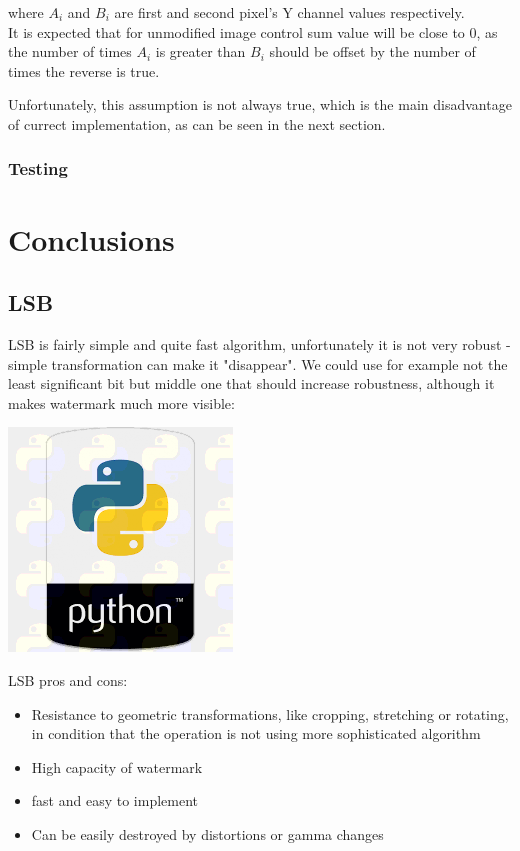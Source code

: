 \documentclass[a4paper, 12pt]{article}
\begin{document}
    where $A_i$ and $B_i$ are first and second pixel's Y channel values respectively. \\
    
    It is expected that for unmodified image control sum value will be close to 0, as the number of times $A_i$ is greater than $B_i$ should be offset by the number of times the reverse is true.
    
    Unfortunately, this assumption is not always true, which is the main disadvantage of currect implementation, as can be seen in the next section.
	
	\subsubsection{Testing}



\section{Conclusions}

	\subsection{LSB}

	LSB is fairly simple and quite fast algorithm, unfortunately it is not very robust - simple transformation can make it "disappear". We could use for example not the least significant bit but middle one that should increase robustness, although it makes watermark much more visible:



	 \begin{center}
		\includegraphics[scale=0.5]{python_lsb/watermarked_python_4bit.png}
	\end{center}

	LSB pros and cons:
	\begin{itemize}

		\item Resistance to geometric transformations, like cropping, stretching or rotating, in condition that the operation is not using more sophisticated algorithm
		\item High capacity of watermark
		\item fast and easy to implement
		\item Can be easily destroyed by distortions or gamma changes




	\end{itemize}
\end{document}
